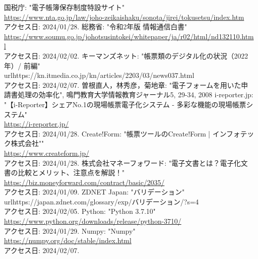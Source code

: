 \documentclass[uplatex, report, a4j, 10pt]{jsbook}
\begin{document}
\begin{thebibliography}{0}
  国税庁: "電子帳簿保存制度特設サイト"\\\url{https://www.nta.go.jp/law/joho-zeikaishaku/sonota/jirei/tokusetsu/index.htm}\\アクセス日: 2024/01/28.
  総務省: "令和2年版 情報通信白書"\\\url{https://www.soumu.go.jp/johotsusintokei/whitepaper/ja/r02/html/nd132110.html}\\アクセス日: 2024/02/02.
  キーマンズネット: "帳票類のデジタル化の状況（2022年）/ 前編"\\url{https://kn.itmedia.co.jp/kn/articles/2203/03/news037.html}\\アクセス日: 2024/02/07.
  曽根直人，林秀彦，菊地章: "電子フォームを用いた申請書処理の効率化", 鳴門教育大学情報教育ジャーナル5, 29-34, 2008
  i-reporter.jp: "【i-Reporter】シェアNo.1の現場帳票電子化システム - 多彩な機能の現場帳票システム"\\\url{https://i-reporter.jp/}\\アクセス日: 2024/01/28.
  Create!Form: "帳票ツールのCreate!Form | インフォテック株式会社""\\\url{https://www.createform.jp/}\\アクセス日: 2024/01/28.
  株式会社マネーフォワード: "電子文書とは？電子化文書の比較とメリット、注意点を解説！"\\\url{https://biz.moneyforward.com/contract/basic/2035/}\\アクセス日: 2024/01/09.
  ZDNET Japan: "バリデーション"\\url{https://japan.zdnet.com/glossary/exp/バリデーション/?s=4}\\アクセス日: 2024/02/05.
  Python: "Python 3.7.10"\\\url{https://www.python.org/downloads/release/python-3710/}\\アクセス日: 2024/01/29.
  Numpy: "Numpy"\\\url{https://numpy.org/doc/stable/index.html}\\アクセス日: 2024/02/07.

\end{thebibliography}
\end{document}
